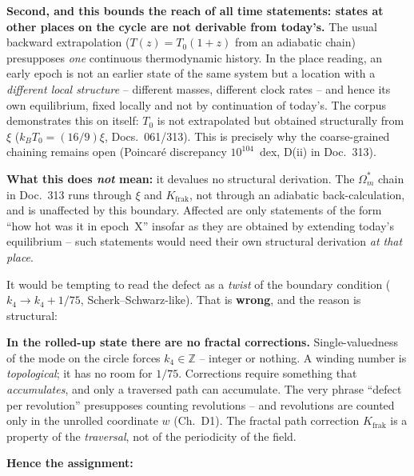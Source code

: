 \documentclass[11pt]{report}
\begin{document}
\textbf{Second, and this bounds the reach of all time statements:
states at other places on the cycle are not derivable from
today's.} The usual backward extrapolation ($T(z) = T_0(1+z)$ from
an adiabatic chain) presupposes \emph{one} continuous
thermodynamic history. In the place reading, an early epoch is not
an earlier state of the same system but a location with a
\emph{different local structure} -- different masses, different
clock rates -- and hence its own equilibrium, fixed locally and
not by continuation of today's. The corpus demonstrates this on
itself: $T_0$ is not extrapolated but obtained structurally from
$\xi$ ($k_BT_0 = (16/9)\xi$, Docs.~061/313). This is precisely why
the coarse-grained chaining remains open (Poincaré discrepancy
$10^{104}$~dex, D(ii) in Doc.~313).

\noindent \textbf{What this does \emph{not} mean:} it devalues no
structural derivation. The $\Omega_m^{*}$ chain in Doc.~313 runs
through $\xi$ and $K_\text{frak}$, not through an adiabatic
back-calculation, and is unaffected by this boundary. Affected are
only statements of the form \enquote{how hot was it in epoch~X}
insofar as they are obtained by extending today's equilibrium --
such statements would need their own structural derivation
\emph{at that place}.

It would be tempting to read the defect as a \emph{twist} of the
boundary condition ($k_4 \to k_4 + 1/75$, Scherk--Schwarz-like).
That is \textbf{wrong}, and the reason is structural:

\textbf{In the rolled-up state there are no fractal corrections.}
Single-valuedness of the mode on the circle forces
$k_4 \in \mathbb{Z}$ -- integer or nothing. A winding number is
\emph{topological}; it has no room for $1/75$. Corrections require
something that \emph{accumulates}, and only a traversed path can
accumulate. The very phrase \enquote{defect per revolution}
presupposes counting revolutions -- and revolutions are counted
only in the unrolled coordinate $w$ (Ch.~D1). The fractal path
correction $K_\text{frak}$ is a property of the \emph{traversal},
not of the periodicity of the field.

\textbf{Hence the assignment:}
\end{document}
